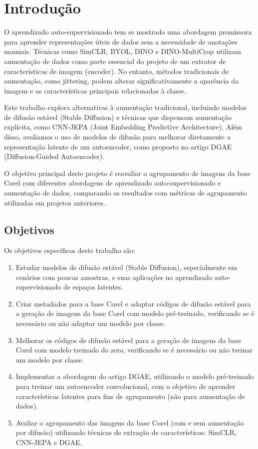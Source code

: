 \chapter{Introdução}

O aprendizado auto-supervisionado tem se mostrado uma abordagem promissora para aprender representações úteis de dados sem a necessidade de anotações manuais. Técnicas como SimCLR, BYOL, DINO e DINO-MultiCrop utilizam aumentação de dados como parte essencial do projeto de um extrator de características de imagem (encoder). No entanto, métodos tradicionais de aumentação, como jittering, podem alterar significativamente a aparência da imagem e as características principais relacionadas à classe.

Este trabalho explora alternativas à aumentação tradicional, incluindo modelos de difusão estável (Stable Diffusion) e técnicas que dispensam aumentação explícita, como CNN-JEPA (Joint Embedding Predictive Architecture). Além disso, avaliamos o uso de modelos de difusão para melhorar diretamente a representação latente de um autoencoder, como proposto no artigo DGAE (Diffusion-Guided Autoencoder).

O objetivo principal deste projeto é reavaliar o agrupamento de imagens da base Corel com diferentes abordagens de aprendizado auto-supervisionado e aumentação de dados, comparando os resultados com métricas de agrupamento utilizadas em projetos anteriores.

\section{Objetivos}

Os objetivos específicos deste trabalho são:

\begin{enumerate}
    \item Estudar modelos de difusão estável (Stable Diffusion), especialmente em cenários com poucas amostras, e suas aplicações no aprendizado auto-supervisionado de espaços latentes.
    \item Criar metadados para a base Corel e adaptar códigos de difusão estável para a geração de imagens da base Corel com modelo pré-treinado, verificando se é necessário ou não adaptar um modelo por classe.
    \item Melhorar os códigos de difusão estável para a geração de imagens da base Corel com modelo treinado do zero, verificando se é necessário ou não treinar um modelo por classe.
    \item Implementar a abordagem do artigo DGAE, utilizando o modelo pré-treinado para treinar um autoencoder convolucional, com o objetivo de aprender características latentes para fins de agrupamento (não para aumentação de dados).
    \item Avaliar o agrupamento das imagens da base Corel (com e sem aumentação por difusão) utilizando técnicas de extração de características: SimCLR, CNN-JEPA e DGAE.
\end{enumerate}

